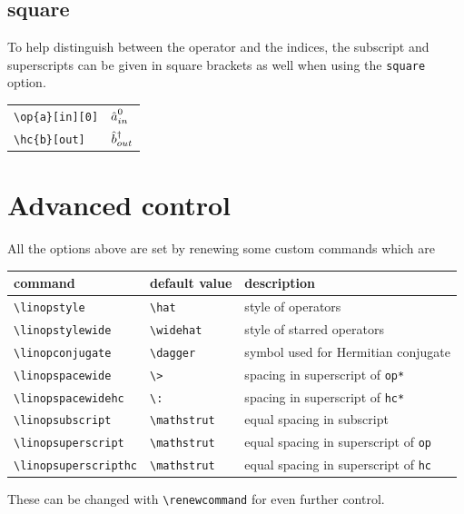 \documentclass[10pt]{article}
\begin{document}
\subsection{square}
To help distinguish between the operator and the indices, the subscript and superscripts can be given in square brackets as well when using the \texttt{square} option.



\begin{table}[H]
	\centering
	\begin{tabular}{ll}
		\verb|\op{a}[in][0]| & $\op{a}[in][0]$ \\
		\verb|\hc{b}[out]| & $\hc{b}[out]$ 
	\end{tabular}
\end{table}

\section{Advanced control}
All the options above are set by renewing some custom commands which are

\begin{table}[H]
	\centering
	\begin{tabular}{lll}
		\toprule
		command & default value & description \\
		\midrule
		\verb|\linopstyle| & \verb|\hat| & style of operators\\
		\verb|\linopstylewide| & \verb|\widehat| & style of starred operators\\
		\verb|\linopconjugate| & \verb|\dagger| & symbol used for Hermitian conjugate\\
		\verb|\linopspacewide| & \verb|\>| & spacing in superscript of \verb|op*|\\
		\verb|\linopspacewidehc| & \verb|\:| & spacing in superscript of \verb|hc*|\\
		\verb|\linopsubscript| & \verb|\mathstrut| & equal spacing in subscript \\
		\verb|\linopsuperscript| & \verb|\mathstrut| & equal spacing in superscript of \verb|op|\\ 
		\verb|\linopsuperscripthc| & \verb|\mathstrut| & equal spacing in superscript of \verb|hc|\\
		\bottomrule
	\end{tabular}
\end{table}

These can be changed with \verb|\renewcommand| for even further control.
	
\end{document}
